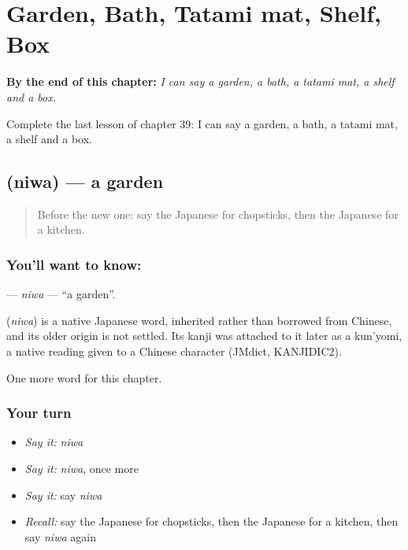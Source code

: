 
\chapter{Garden, Bath, Tatami mat, Shelf, Box}
\label{ch:ja-garden-bath-tatami-mat-shelf-box}

\begin{chapteropening}
\textbf{By the end of this chapter:} \emph{I can say a garden, a bath, a tatami mat, a shelf and a box.}

Complete the last lesson of chapter 39: I can say a garden, a bath, a tatami mat, a shelf and a box.
\end{chapteropening}

\section[\texorpdfstring{\ja{にわ} (niwa)}{にわ (niwa)}]{ (niwa) — a garden}

\label{lesson:JA-C39-niwa}



\begin{quote}
Before the new one: say the Japanese for chopsticks, then the Japanese for a kitchen.
\end{quote}

\subsection*{You'll want to know: }
\textbf{} — \emph{niwa} — \textquotedblleft{}a garden\textquotedblright{}.

\begin{cousinweb}
\textbf{} (\emph{niwa}) is a native Japanese word, inherited rather than borrowed from Chinese, and its older origin is not settled. Its kanji was attached to it later as a kun'yomi, a native reading given to a Chinese character (JMdict, KANJIDIC2).
\end{cousinweb}

\begin{grammarlens}[title={What you've built}]
One more word for this chapter.
\end{grammarlens}

\subsection*{Your turn}
\begin{itemize}
\raggedright
  \item \emph{Say it:} \emph{niwa}
  \item \emph{Say it:} \emph{niwa}, once more
  \item \emph{Say it:} say \emph{niwa}
  \item \emph{Recall:} say the Japanese for chopsticks, then the Japanese for a kitchen, then say \emph{niwa} again
\end{itemize}

